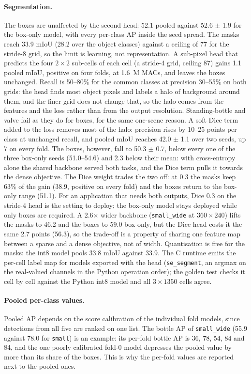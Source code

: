 \documentclass[11pt,a4paper]{article}
\newcommand{\cfg}[1]{\texttt{#1}}
\begin{document}
\paragraph{Segmentation.} The boxes are unaffected by the second head:
52.1 pooled against 52.6 $\pm$ 1.9 for the box-only model, with every
per-class AP inside the seed spread. The masks reach 33.9 mIoU (28.2 over
the object classes) against a ceiling of 77 for the stride-8 grid, so the
limit is learning, not representation. A sub-pixel head that predicts the
four $2 \times 2$ sub-cells of each cell (a stride-4 grid, ceiling 87) gains
1.1 pooled mIoU, positive on four folds, at 1.6~M MACs, and leaves the boxes
unchanged. Recall is 50--80\% for the common classes at precision 30--55\%
on both grids: the head finds most object pixels and labels a halo of
background around them, and the finer grid does not change that, so the
halo comes from the features and the loss rather than from the output
resolution. Standing-bottle and valve fail as they do for boxes, for the
same one-scene reason. A soft Dice term added to the loss removes most of
the halo: precision rises by 10--25 points per class at unchanged recall,
and pooled mIoU reaches 42.0 $\pm$ 1.1 over two seeds, up 7 on every fold.
The boxes, however, fall to 50.3 $\pm$ 0.7, below every one of the three
box-only seeds (51.0--54.6) and 2.3 below their mean: with cross-entropy
alone the shared backbone served both tasks, and the Dice term pulls it
towards the dense objective. The Dice weight trades the two off: at 0.3
the masks keep 63\% of the gain (38.9, positive on every fold) and the
boxes return to the box-only range (51.1). For an application that needs
both outputs, Dice 0.3 on the stride-4 head is the setting to deploy; the
box-only model stays deployed while only boxes are required. A 2.6$\times$
wider backbone (\cfg{small\_wide} at $360 \times 240$) lifts the masks to
46.2 and the boxes to 59.0 box-only, but the Dice head costs it the same
2.7 points (56.3), so the trade-off is a property of sharing one feature
map between a sparse and a dense objective, not of width. Quantisation is free for the
masks: the int8 model pools 33.8 mIoU against 33.9. The C runtime emits the
per-cell label map for models exported with the head (\texttt{se\_segment},
an argmax on the real-valued channels in the Python operation order); the
golden test checks it cell by cell against the Python int8 model and all
$3 \times 1350$ cells agree.

\paragraph{Pooled per-class values.} Pooled AP depends on the score
calibration of the individual fold models, since detections from all five
are ranked on one list. The bottle AP of \cfg{small\_wide} (55.9 against 78.0
for \cfg{small}) is an example: its per-fold bottle AP is 36, 78, 54, 84 and
84, and the one poorly calibrated fold-0 model depresses the pooled value by
more than its share of the boxes. This is why the per-fold values are
reported next to the pooled ones.
\end{document}
